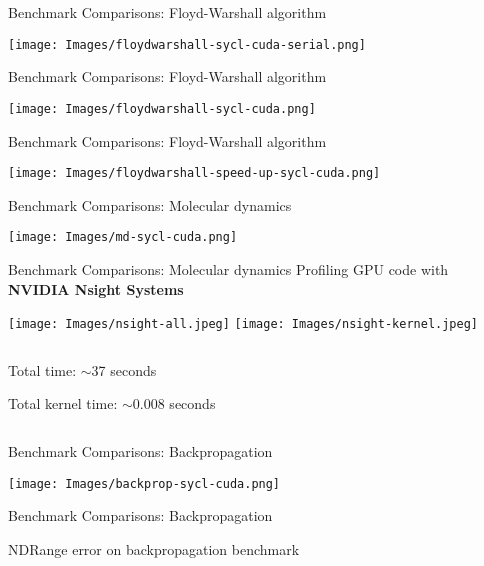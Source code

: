 \begin{frame}{Benchmark Comparisons: Floyd-Warshall algorithm}
  \begin{center}
  \texttt{[image: Images/floydwarshall-sycl-cuda-serial.png]}
  \end{center}
\end{frame}
\begin{frame}{Benchmark Comparisons: Floyd-Warshall algorithm}
  \begin{center}
  \texttt{[image: Images/floydwarshall-sycl-cuda.png]}
  \end{center}
\end{frame}
\begin{frame}{Benchmark Comparisons: Floyd-Warshall algorithm}
  \begin{center}
  \texttt{[image: Images/floydwarshall-speed-up-sycl-cuda.png]}
  \end{center}
\end{frame}
\begin{frame}{Benchmark Comparisons: Molecular dynamics}
  \begin{center}
    \texttt{[image: Images/md-sycl-cuda.png]}
  \end{center}
\end{frame}
\begin{frame}{Benchmark Comparisons: Molecular dynamics}
  Profiling GPU code with \textbf{NVIDIA Nsight Systems}
  \begin{center}
  \texttt{[image: Images/nsight-all.jpeg]}
  \texttt{[image: Images/nsight-kernel.jpeg]}
  \end{center}
  \begin{columns}
    \begin{column}{0.48\textwidth}
      Total time: $\sim$37 seconds

      Total kernel time: $\sim$0.008 seconds
    \end{column}
  \end{columns}
\end{frame}
\begin{frame}{Benchmark Comparisons: Backpropagation}
  \begin{center}
  \texttt{[image: Images/backprop-sycl-cuda.png]}
  \end{center}
\end{frame}

\begin{frame}{Benchmark Comparisons: Backpropagation}
\centering

NDRange error on backpropagation benchmark
\end{frame}
